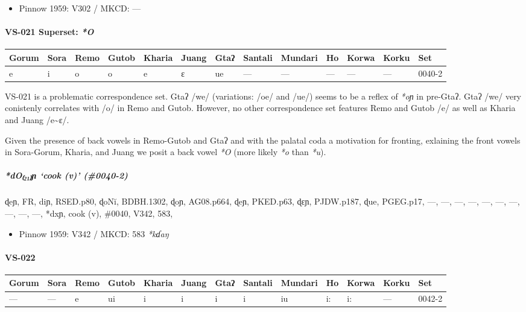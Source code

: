 \documentclass[a4paper,]{article}
\providecommand{\tightlist}{%
  \setlength{\itemsep}{0pt}\setlength{\parskip}{0pt}}
\let\oldparagraph\paragraph
\renewcommand{\paragraph}[1]{\oldparagraph{#1}\mbox{}}
\let\oldsubparagraph\subparagraph
\renewcommand{\subparagraph}[1]{\oldsubparagraph{#1}\mbox{}}
\begin{document}
\begin{itemize}
\tightlist
\item
  Pinnow 1959: V302 / MKCD: ---
\end{itemize}

\paragraph{\texorpdfstring{VS-021 Superset:
\emph{*O}}{VS-021 Superset: *O}}\label{vs-021-superset-o}

\begin{longtable}[]{@{}lllllllllllll@{}}
\toprule
Gorum & Sora & Remo & Gutob & Kharia & Juang & Gtaʔ & Santali & Mundari
& Ho & Korwa & Korku & Set\tabularnewline
\midrule
\endhead
e & i & o & o & e & ɛ & ue & --- & --- & --- & --- & --- &
0040-2\tabularnewline
\bottomrule
\end{longtable}

VS-021 is a problematic correspondence set. Gtaʔ /we/ (variations: /oe/
and /ue/) seems to be a reflex of \emph{*oɲ} in pre-Gtaʔ. Gtaʔ /we/ very
conistenly correlates with /o/ in Remo and Gutob. However, no other
correspondence set features Remo and Gutob /e/ as well as Kharia and
Juang /e\textasciitilde{}ɛ/.

Given the presence of back vowels in Remo-Gutob and Gtaʔ and with the
palatal coda a motivation for fronting, exlaining the front vowels in
Sora-Gorum, Kharia, and Juang we posit a back vowel \emph{*O} (more
likely \emph{*o} than \emph{*u}).

\subparagraph{\texorpdfstring{\emph{*dO₍₂₁₎ɲ} `cook (v)'
(\#0040-2)}{*dO₍₂₁₎ɲ cook (v) (\#0040-2)}}\label{doux272-cook-v-0040-2}

ɖeɲ, FR, diɲ, RSED.p80, ɖoNĭ, BDBH.1302, ɖoɲ, AG08.p664, ɖeɲ, PKED.p63,
ɖɛɲ, PJDW.p187, ɖue, PGEG.p17, ---, ---, ---, ---, ---, ---, ---, ---,
---, ---, *dxɲ, cook (v), \#0040, V342, 583,

\begin{itemize}
\tightlist
\item
  Pinnow 1959: V342 / MKCD: 583 \emph{*kɗaŋ}
\end{itemize}

\paragraph{VS-022}\label{vs-022}

\begin{longtable}[]{@{}lllllllllllll@{}}
\toprule
Gorum & Sora & Remo & Gutob & Kharia & Juang & Gtaʔ & Santali & Mundari
& Ho & Korwa & Korku & Set\tabularnewline
\midrule
\endhead
--- & --- & e & ui & i & i & i & i & iu & i: & i: & --- &
0042-2\tabularnewline
\bottomrule
\end{longtable}
\end{document}
